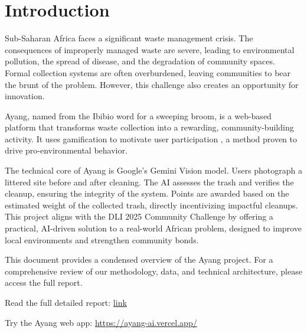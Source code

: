 \chapter[Introduction]{Introduction}
\label{cp:introduction}

{
    \parindent0pt

    Sub-Saharan Africa faces a significant waste management crisis. The consequences of improperly managed waste are severe, leading to environmental pollution, the spread of disease, and the degradation of community spaces. Formal collection systems are often overburdened, leaving communities to bear the brunt of the problem. However, this challenge also creates an opportunity for innovation.

    \vspace{.935em}
    Ayang, named from the Ibibio word for a sweeping broom, is a web-based platform that transforms waste collection into a rewarding, community-building activity. It uses gamification to motivate user participation , a method proven to drive pro-environmental behavior.

    \vspace{.935em}
    The technical core of Ayang is Google's Gemini Vision model. Users photograph a littered site before and after cleaning. The AI assesses the trash and verifies the cleanup, ensuring the integrity of the system. Points are awarded based on the estimated weight of the collected trash, directly incentivizing impactful cleanups. This project aligns with the DLI 2025 Community Challenge by offering a practical, AI-driven solution to a real-world African problem, designed to improve local environments and strengthen community bonds.

    \vspace{.935em}
    This document provides a condensed overview of the Ayang project. For a comprehensive review of our methodology, data, and technical architecture, please access the full report.

    \vspace{.935em}
    Read the full detailed report: \href{https://drive.google.com/file/d/1dQtCNl9HtdUR7oaR-Z_yMTsNeOd9Zuac/view?usp=sharing}{link}

    Try the Ayang web app: \url{https://ayang-ai.vercel.app/}
}